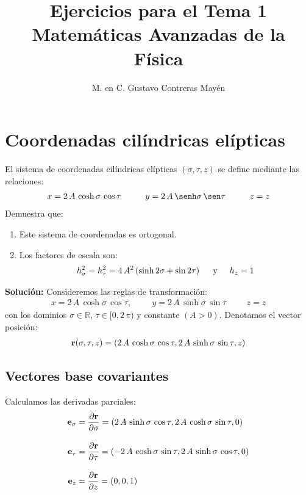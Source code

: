 \documentclass[12pt]{article}
\title{Ejercicios para el Tema 1 \\ \large{Matemáticas Avanzadas de la Física}}
\author{M. en C. Gustavo Contreras Mayén}
\date{ }
\begin{document}
\vspace{-4cm}

\maketitle
\fontsize{14}{14}\selectfont

\section*{Coordenadas cilíndricas elípticas}

El sistema de coordenadas cilíndricas elípticas $(\sigma, \tau, z)$ se define mediante las relaciones:
\begin{align*}
    x = 2 \, A \, \cosh \sigma \, \cos \tau \hspace{1cm} y = 2 \, A \, \senh \sigma \, \sen \tau \hspace{1cm} z = z
\end{align*}
Demuestra que:
\begin{enumerate}
\item Este sistema de coordenadas es ortogonal.
\item Los factores de escala son:
\begin{align*}
    h^{2}_{\sigma} = h^{2}_{\tau} = 4 \, A^{2} \left( \sinh 2 \sigma + \sin 2 \tau \right) \hspace{0.5cm} \text{y} \hspace{0.5cm} h_{z} = 1
\end{align*}
\end{enumerate}

\vspace{1cm}
\noindent
\textbf{Solución: } Consideremos las reglas de transformación:
\begin{align*}
x = 2\, A \, \cosh \sigma \, \cos \tau, \hspace{1cm}  y = 2 \, A \, \sinh \sigma \, \sin \tau \hspace{1cm} z = z
\end{align*}
con los dominios $\sigma \in \mathbb{R}, \, \tau \in [0, 2 \, \pi)$ y constante $(A > 0)$. Denotamos el vector posición:
\begin{align*}
\vb{r} (\sigma, \tau, z) = \left( 2 \,A \, \cosh \sigma \, \cos \tau, 2 \, A \, \sinh \sigma \, \sin \tau, z \right)
\end{align*}

\subsection*{Vectores base covariantes}
Calculamos las derivadas parciales:
\begin{align*}
\vb{e}_{\sigma} &= \pdv{\vb{r}}{\sigma} = \left( 2 \, A \, \sinh \sigma \, \cos \tau, 2 \, A \, \cosh \sigma \, \sin \tau, 0 \right) \\[1em]
\vb{e}_{\tau} &= \pdv{\vb{r}}{\tau} = \left( - 2 \, A \, \cosh \sigma \, \sin \tau, 2 \, A \, \sinh \sigma \, \cos \tau,  0 \right) \\[1em]
\vb{e}_{z} &= \pdv{\vb{r}}{z} = (0, 0, 1)
\end{align*}
\end{document}
